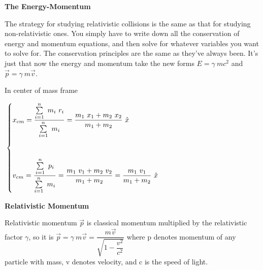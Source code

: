 \documentclass[fleqn]{article}
\begin{document}
\vspace{10px}

\textbf{The Energy-Momentum}

\vspace{10px}

The strategy for studying relativistic collisions is the same as that for studying non-relativistic ones. You simply
have to write down all the conservation of energy and momentum equations, and then solve for whatever variables
you want to solve for. The conservation principles are the same as they've always been. It's just that now the
energy and momentum take the new forms $E=\gamma ~ mc^2$ and $\overrightarrow{p}=\gamma ~ m \overrightarrow{v}$.



In center of mass frame

$
  \\
  \begin{cases}
    x_{cm}=\dfrac{
      \sum\limits_{i=1}^{n} ~ m_i ~ r_i
    }{
      \sum\limits_{i=1}^{n} ~ m_i
    }=\dfrac{m_1 ~ x_1+m_2 ~ x_2}{m_1+m_2} ~ \hat{x}
    \\
    \\
    \\
    v_{cm}=\dfrac{
      \sum\limits_{i=1}^{n} ~ p_i
    }{
      \sum\limits_{i=1}^{n} ~ m_i
    }=\dfrac{m_1 ~ v_1+m_2 ~ v_2}{m_1+m_2}=\dfrac{m_1 ~ v_1}{m_1+m_2} ~ \hat{x}
  \end{cases}
  \\
  \\
  \\
$

\textbf{Relativistic Momentum}

\vspace{10px}

Relativistic momentum $\overrightarrow{p}$ is classical momentum multiplied by the relativistic factor 
$\gamma$, so it is $\overrightarrow{p}=\gamma ~ m \overrightarrow{v}=\dfrac{m \overrightarrow{v}}{\sqrt{1-\dfrac{v^2}{c^2}}}$
where p denotes momentum of any particle with mass, v denotes velocity, and c is the speed of light.

\vspace{20px}
\end{document}
